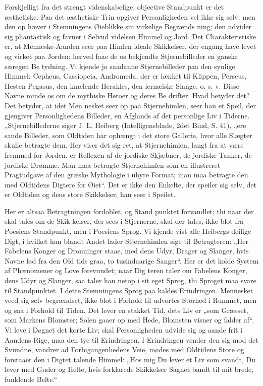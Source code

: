 \documentclass[12pt]{book}
\newcommand{\opage}[1]{\marginnote{\footnotesize\textit{[#1]}}}
\begin{document}
Forskjelligt fra det strengt videnskabelige, objective
Standpunkt er det æsthetiske. Paa det æsthetiske Trin
opgiver Personligheden vel ikke sig selv, men den op\-%
hæver i Stemningens Øieblikke sin virkelige Begrænds\-%
\opage{200}\setcounter{footnote}{0}%
ning; den udvider sig phantastisk og favner i Selvud\-%
videlsen Himmel og Jord. Det Charakteristiske er, at
Menneske-Aanden seer paa Himlen ideale Skikkelser,
der engang have levet og virket paa Jorden; herved faae
de os bekjendte Stjernebilleder en ganske særegen Be\-%
tydning. Vi kjende jo saadanne Stjernebilleder paa den
synlige Himmel: Cepheus, Cassiopeia, Andromeda, der
er lænket til Klippen, Perseus, Hesten Pegasus, den
knælende Herakles, den lernæiske Slange, o. s. v. Disse
Navne minde os om de mythiske Heroer og deres Be\-%
drifter. Hvad betyder det? Det betyder, at idet Men\-%
nesket seer op paa Stjernehimlen, seer han et Speil, der
gjengiver Personlighedens Billeder, en Afglands af det
personlige Liv i Tiderne. „Stjernebillederne siger J. L.
Heiberg (Intelligensblade, 2det Bind, S. 41), „ere sande
Billeder, som Oldtiden har ophængt i det store Gallerie,
hvor alle Slægter skulle betragte dem. Her viser det sig
ret, at Stjernehimlen, langt fra at være fremmed for Jorden,
er Reflexen af de jordiske Skjæbner, de jordiske Tanker,
de jordiske Drømme. Man maa betragte Stjernehimlen
som en illustreret Pragtudgave af den græske Mythologie
i uhyre Format; man maa betragte den med Oldtidens
Digtere for Øiet“. Det er ikke den Enkelte, der speiler
sig selv, det er Oldtiden og dens store Skikkelser, han
seer i Speilet.

Her er altsaa Betragtningen fordoblet, og Stand\-%
punktet forvandlet; thi naar der skal tales om de Skik\-%
kelser, der sees i Stjernerne, skal der tales, ikke blot
fra Poesiens Standpunkt, men i Poesiens Sprog. Vi
kjende vist alle Heibergs deilige Digt, i hvilket han
blandt Andet lader Stjernehimlen sige til Betragteren:
„Her Fabelens Konger og Dronninger staae, med dens
Udyr, Drager og Slanger, hvis Navne lød fra den Old\-%
tids graa, to tusindaarige Sanger“. Her er det kolde
\opage{201}\setcounter{footnote}{0}%
System af Phænomener og Love forsvundet; naar Dig\-%
teren taler om Fabelens Konger, dens Udyr og Slanger,
saa taler han netop i sit eget Sprog, thi Sproget maa
svare til Standpunktet. I dette Stemningens Sprog paa\-%
kaldes Erindringen. Mennesket veed sig selv begrændset,
ikke blot i Forhold til udvortes Storhed i Rummet, men og\-%
saa i Forhold til Tiden. Det lever en stakket Tid, dets Liv
er „som Græsset, som Markens Blomster; Solen gaaer
op med Hede, Blomsten visner og falder af“. Vi leve i
Døgnet det korte Liv; skal Personligheden udvide sig og
aande frit i Aandens Rige, maa den tye til Erindringen.
I Erindringen vender den sig mod det Svundne, vandrer
ad Forbigangenhedens Veie, mødes med Oldtidens Store
og forstaaer den i Digtet talende Himmel: „Hos mig Du
lever et Liv som svandt, Du lever med Guder og Helte,
hvis forklarede Skikkelser Sagnet bandt til mit brede,
funklende Belte.“
\end{document}
